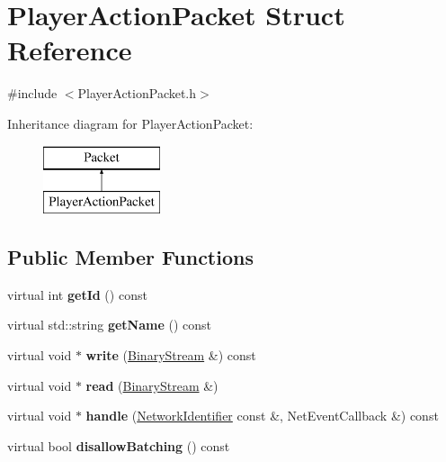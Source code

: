 \hypertarget{struct_player_action_packet}{}\section{Player\+Action\+Packet Struct Reference}
\label{struct_player_action_packet}


{\ttfamily \#include $<$Player\+Action\+Packet.\+h$>$}

Inheritance diagram for Player\+Action\+Packet\+:\begin{figure}[H]
\begin{center}
\leavevmode
\includegraphics[height=2.000000cm]{struct_player_action_packet}
\end{center}
\end{figure}
\subsection*{Public Member Functions}
\begin{DoxyCompactItemize}
\item 
\mbox{\label{struct_player_action_packet_ae6a83ecd08d4303e641e06de937f04b4}} 
virtual int {\bfseries get\+Id} () const
\item 
\mbox{\label{struct_player_action_packet_a76a8d3c20d3105373590087a7d5aff59}} 
virtual std\+::string {\bfseries get\+Name} () const
\item 
\mbox{\label{struct_player_action_packet_a6db0a4e92fc1c76ebf6623ee67ee3d7d}} 
virtual void $\ast$ {\bfseries write} (\mbox{\hyperlink{struct_binary_stream}{Binary\+Stream}} \&) const
\item 
\mbox{\label{struct_player_action_packet_acacf14db1948e035cc2352872e74f7b6}} 
virtual void $\ast$ {\bfseries read} (\mbox{\hyperlink{struct_binary_stream}{Binary\+Stream}} \&)
\item 
\mbox{\label{struct_player_action_packet_ab4c7a3f34902ff44873ec90f6a732dd3}} 
virtual void $\ast$ {\bfseries handle} (\mbox{\hyperlink{struct_network_identifier}{Network\+Identifier}} const \&, Net\+Event\+Callback \&) const
\item 
\mbox{\label{struct_player_action_packet_a81e62e5bff6ac256f1e293274f89c351}} 
virtual bool {\bfseries disallow\+Batching} () const
\end{DoxyCompactItemize}
